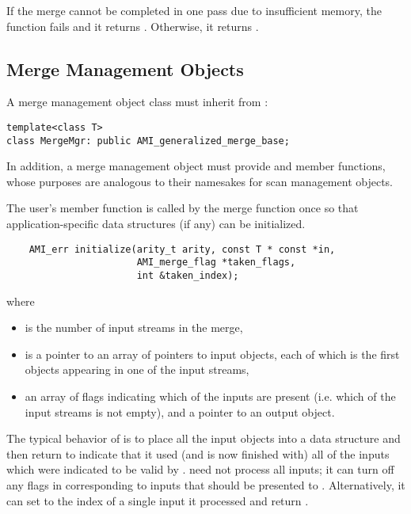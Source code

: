 If the merge cannot be completed in one pass due to insufficient
memory, the function fails and it returns
. Otherwise, it returns
.



\subsection{Merge Management Objects}\label{ssec:mmo}

A merge management object class must inherit from
:
\begin{verbatim}
template<class T>
class MergeMgr: public AMI_generalized_merge_base;
\end{verbatim}
In addition, 
a merge management object must provide 
and  member functions, whose purposes are
analogous to their namesakes for scan management objects.

    The user's  member function is
    called by the merge function once so that
    application-specific data structures (if any) can be
    initialized.
\begin{verbatim}
    AMI_err initialize(arity_t arity, const T * const *in,
                       AMI_merge_flag *taken_flags,
                       int &taken_index);
\end{verbatim}
 
    where
    \begin{itemize}
        \item {} is the number of input streams
        in the merge,
        \item {} is a pointer to an array of
        pointers to input objects, each of which is the
        first objects appearing in one of the input streams,    
        \item {} an array of flags
        indicating which of the inputs are present (i.e.
        which of the input streams is not empty), and a
        pointer to an output object.
    \end{itemize}
    
    The typical behavior of  is to
    place all the input objects into a data structure and
    then return  to
    indicate that it used (and is now finished with) all of
    the inputs which were indicated to be valid by
    .   need not
    process all inputs; it can turn off any flags in
     corresponding to inputs that
    should be presented to .
    Alternatively, it can set  to the
    index of a single input it processed and return
    .

